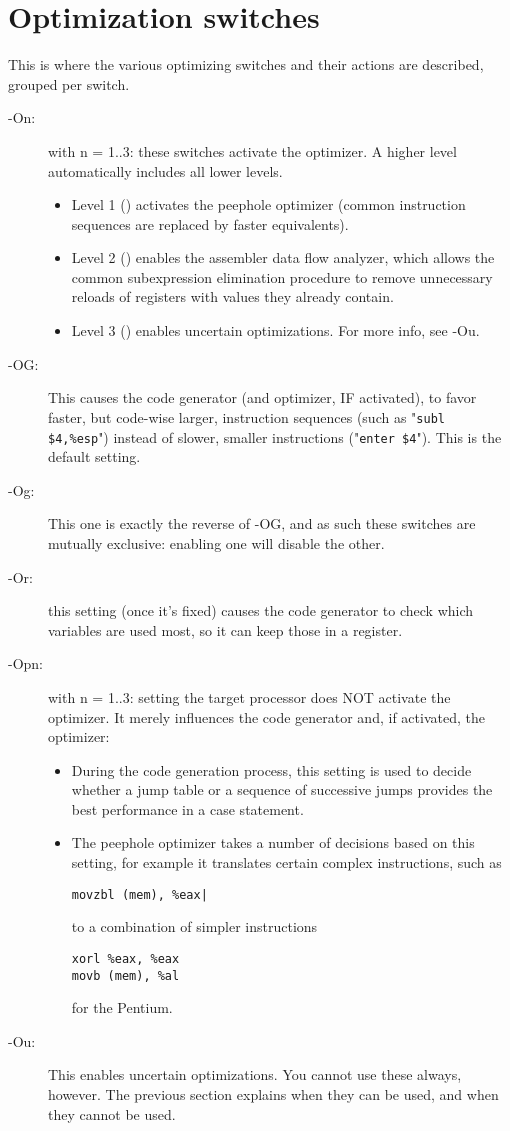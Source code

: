 \documentclass{report}
\begin{document}
\section{Optimization switches}
This is where the various optimizing switches and their actions are
described, grouped per switch.

\begin{description}
\item [-On:\ ] with n = 1..3: these switches activate the optimizer.
A higher level automatically includes all lower levels.
\begin{itemize}
\item Level 1 () activates the peephole optimizer
 (common instruction sequences are replaced by faster equivalents).
\item Level 2 () enables the assembler data flow analyzer,
which allows the common subexpression elimination procedure to
remove unnecessary reloads of registers with values they already contain.
\item Level 3 () enables uncertain optimizations. For more info, see -Ou.
\end{itemize}
\item[-OG:\ ]
This causes the code generator (and optimizer, IF activated), to favor
faster, but code-wise larger, instruction sequences (such as
"\verb|subl $4,%esp|") instead of slower, smaller instructions
("\verb|enter $4|").  This is the default setting.

\item[-Og:\ ] This one is exactly the reverse of -OG, and as such these
switches are mutually exclusive: enabling one will disable the other.

\item[-Or:\ ] this setting (once it's fixed) causes the code generator to
check which variables are used most, so it can keep those in a register.

\item[-Opn:\ ] with n = 1..3: setting the target processor does NOT
activate the optimizer. It merely influences the code generator and,
if activated, the optimizer:
\begin{itemize}
\item During the code generation process, this setting is used to
decide whether a jump table or a sequence of successive jumps provides
the best performance in a case statement.
\item The peephole optimizer takes a number of decisions based on this
setting, for example it translates certain complex instructions, such
as
\begin{verbatim}
movzbl (mem), %eax|
\end{verbatim}
to a combination of simpler instructions
\begin{verbatim}
xorl %eax, %eax
movb (mem), %al
\end{verbatim}
for the Pentium.
\end{itemize}
\item[-Ou:\ ] This enables uncertain optimizations. You cannot use these
always, however. The previous section explains when they can be used, and
when they cannot be used.
\end{description}
\end{document}
